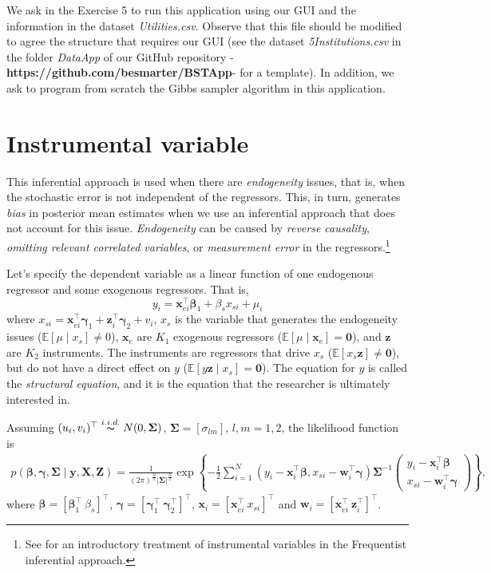 We ask in the Exercise 5 to run this application using our GUI and the information in the dataset \textit{Utilities.csv}. Observe that this file should be modified to agree the structure that requires our GUI (see the dataset \textit{5Institutions.csv} in the folder \textit{DataApp} of our GitHub repository -\textbf{https://github.com/besmarter/BSTApp}- for a template). In addition, we ask to program from scratch the Gibbs sampler algorithm in this application.  

\section{Instrumental variable}\label{sec73}

This inferential approach is used when there are \textit{endogeneity} issues, that is, when the stochastic error is not independent of the regressors. This, in turn, generates \textit{bias} in posterior mean estimates when we use an inferential approach that does not account for this issue. \textit{Endogeneity} can be caused by \textit{reverse causality}, \textit{omitting relevant correlated variables}, or \textit{measurement error} in the regressors.\footnote{See \cite[Chap. ~15]{wooldridge2016introductory} for an introductory treatment of instrumental variables in the Frequentist inferential approach.}

Let’s specify the dependent variable as a linear function of one endogenous regressor and some exogenous regressors. That is, 
\[
y_{i} = \bm{x}_{ei}^{\top}\bm{\beta}_1 + \beta_s x_{si} + \mu_{i}
\]
where \(x_{si} = \bm{x}_{ei}^{\top}\bm{\gamma}_1 + \bm{z}_i^{\top}\bm{\gamma}_2 + v_{i}\), \(x_s\) is the variable that generates the endogeneity issues (\(\mathbb{E}[\mu \mid x_{s}] \neq 0\)), \(\bm{x}_e\) are \(K_1\) exogenous regressors (\(\mathbb{E}[\mu \mid \bm{x}_{e}] = \bm{0}\)), and \(\bm{z}\) are \(K_2\) instruments. The instruments are regressors that drive \(x_s\) (\(\mathbb{E}[x_{s} \bm{z}] \neq \bm{0}\)), but do not have a direct effect on \(y\) (\(\mathbb{E}[y \bm{z} \mid x_s] = \bm{0}\)). The equation for \(y\) is called the \textit{structural equation}, and it is the equation that the researcher is ultimately interested in.

Assuming $(u_{i},v_i)^{\top}\stackrel{i.i.d.} {\thicksim} {N}(0,\bm{\Sigma})$, $\bm{\Sigma}=[\sigma_{lm}]$, $l,m=1,2$, the likelihood function is
\begin{align*}
	p(\bm{\beta},\bm{\gamma},\bm{\Sigma}\mid \bm{y},\bm{X},\bm{Z})=\frac{1}{(2\pi)^\frac{N}{2}|\bm{\Sigma}|^\frac{N}{2}}\exp\left\{-\frac{1}{2}\sum_{i=1}^N(y_i-\bm{x}_i^{\top}\bm{\beta}, x_{si} -\bm{w}_i^{\top}\bm{\gamma})\bm{\Sigma}^{-1}
	\begin{pmatrix}
		y_i-\bm{x}_i^{\top}\bm{\beta} \\
		x_{si}-\bm{w}_i^{\top}\bm{\gamma}
	\end{pmatrix}
	\right\},
\end{align*}
where $\bm{\beta}=\left[\bm{\beta}_1^{\top} \ \beta_s\right]^{\top}$, $\bm{\gamma}=\left[\bm{\gamma}_1^{\top} \ \bm{\gamma}_2^{\top}\right]^{\top}$, $\bm{x}_i=\left[\bm{x}_{ei}^{\top} \ x_{si}\right]^{\top}$ and $\bm{w}_i=\left[\bm{x}_{ei}^{\top} \ \bm{z}_{i}^{\top}\right]^{\top}$.

